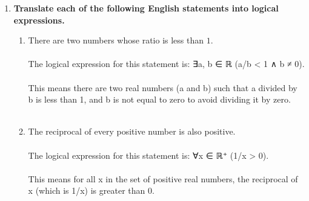 \documentclass{amsart}
\theoremstyle{definition}
\theoremstyle{Exercise}
\theoremstyle{remark}
\theoremstyle{rule}
\numberwithin{equation}{section}
\begin{document}
\begin{enumerate}[label=(\alph*)]
\item {\bf Translate each of the following English statements into logical expressions.}
\begin{enumerate}[label=(\roman*)]
  \item There are two numbers whose ratio is less than $1$.
   \\\\
The logical expression for this statement is: ∃a, b ∈ ℝ (a/b < 1 ∧ b ≠ 0). 
\\\\
This means there are two real numbers (a and b) such that a divided by b is less than 1, and b is not equal to zero to avoid dividing it by zero.
\\\\
  \item The reciprocal of every positive number is also positive.
   \\\\
The logical expression for this statement is: ∀x ∈ ℝ⁺ (1/x > 0). 
\\\\
This means for all x in the set of positive real numbers, the reciprocal of x (which is 1/x) is greater than 0.
\\\\
  \end{enumerate}
  \end{enumerate}
  \newpage
  \section*{}
  \section*{}
\end{document}
